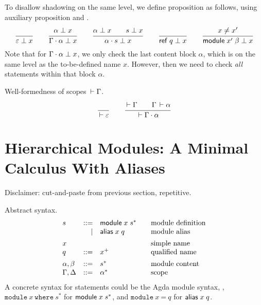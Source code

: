 \documentclass{article}
\theoremstyle{definition}
\theoremstyle{plain}
\theoremstyle{remark}
\begin{document}
To disallow shadowing on the same level, we define proposition
 as follows, using auxiliary proposition
 and
.
\begin{gather*}
  \ru{}{\NoClash \Ge x}
\qquad
  \ru{\NoClash \alpha x
    }{\NoClash {\Gamma \sep \alpha} x}
\qquad
  \ru{\NoClash \alpha x \qquad \NoClash s x
    }{\NoClash {\alpha \sep s} x}
\qquad
  \ru{}{\NoClash {\mref q} x}
\qquad
  \ru{x \not= x'
    }{\NoClash {\mdef {x'} \beta} x}
\end{gather*}
Note that for $\Gamma \cdot \alpha \perp x$,
we only check the last content block $\alpha$,
which is on the same level as the to-be-defined name $x$.
However, then we need to check \emph{all} statements within that block
$\alpha$.

Well-formedness of scopes $\,\vdash\Gamma$.
\begin{gather*}
  \ru{}{\WScope \Ge}
\qquad
  \ru{\WScope \Gamma \qquad \WContent \Gamma \alpha
    }{\WScope {\Gamma \sep \alpha}}
\end{gather*}



\section{Hierarchical Modules: A Minimal Calculus With Aliases}

Disclaimer: cut-and-paste from previous section, repetitive.

Abstract syntax.
\[
\begin{array}{lrl@{\qquad}l}
  s & ::=  & \mdef x {s^*}    & \mbox{module definition} \\
    & \mid & \malias x q      & \mbox{module alias}  \\[1ex]
  x &  &                      & \mbox{simple name}       \\
  q & ::=  & x^+              & \mbox{qualified name}    \\[1ex]
  \alpha,\beta  & ::= & s^*   & \mbox{module content}    \\
  \Gamma,\Delta & ::= & \Ga^* & \mbox{scope}             \\
\end{array}
\]
A concrete syntax for statements could be the Agda module syntax, \ie,
$\texttt{module}~x~\texttt{where}~s^*$ for $\mathsf{module}\;x\;s^*$, and
$\texttt{module}~x~\texttt{=}~q$ for $\mathsf{alias}\;x\;q$.
\end{document}

